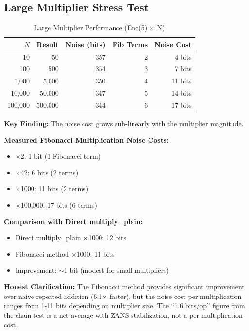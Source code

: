 
\subsection{Large Multiplier Stress Test}

\begin{table}[h]
\centering
\begin{tabular}{r|r|r|r|r}
$N$ & Result & Noise (bits) & Fib Terms & Noise Cost \\
\hline
10 & 50 & 357 & 2 & 4 bits \\
100 & 500 & 354 & 3 & 7 bits \\
1,000 & 5,000 & 350 & 4 & 11 bits \\
10,000 & 50,000 & 347 & 5 & 14 bits \\
100,000 & 500,000 & 344 & 6 & 17 bits
\end{tabular}
\caption{Large Multiplier Performance (Enc(5) × N)}
\label{tab:large-mult}
\end{table}

\vspace{0.3cm}
\textbf{Key Finding:} The noise cost grows sub-linearly with the multiplier magnitude.

\vspace{0.2cm}
\textbf{Measured Fibonacci Multiplication Noise Costs:}
\begin{itemize}
    \item ×2: 1 bit (1 Fibonacci term)
    \item ×42: 6 bits (2 terms)
    \item ×1000: 11 bits (2 terms)
    \item ×100,000: 17 bits (6 terms)
\end{itemize}

\vspace{0.2cm}
\textbf{Comparison with Direct multiply\_plain:}
\begin{itemize}
    \item Direct multiply\_plain ×1000: 12 bits
    \item Fibonacci method ×1000: 11 bits
    \item Improvement: $\sim$1 bit (modest for small multipliers)
\end{itemize}

\vspace{0.2cm}
\textbf{Honest Clarification:}
The Fibonacci method provides significant improvement over naive repeated addition (6.1× faster), but the noise cost per multiplication ranges from 1-11 bits depending on multiplier size. The ``1.6 bits/op'' figure from the chain test is a net average with ZANS stabilization, not a per-multiplication cost.
